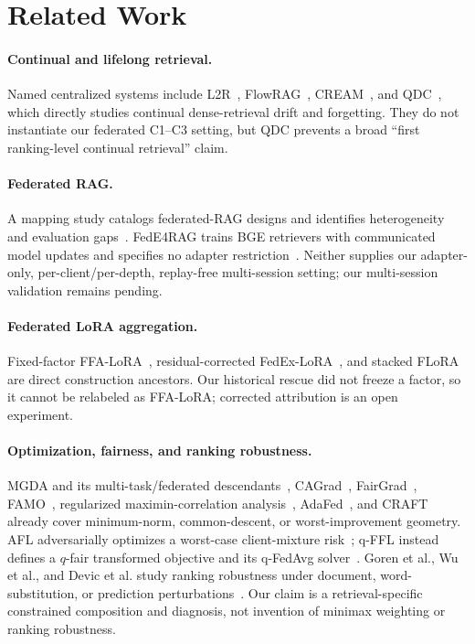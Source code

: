 \documentclass[sigconf,anonymous,review]{acmart}
\begin{document}
\section{Related Work}\label{sec:related}
\paragraph{Continual and lifelong retrieval.} Named centralized systems include L2R~\cite{cai2023l2r}, FlowRAG~\cite{zhang2026flowrag}, CREAM~\cite{cream2026}, and QDC~\cite{goswami2025qdc}, which directly studies continual dense-retrieval drift and forgetting. They do not instantiate our federated C1--C3 setting, but QDC prevents a broad ``first ranking-level continual retrieval'' claim.
\paragraph{Federated RAG.} A mapping study catalogs federated-RAG designs and identifies heterogeneity and evaluation gaps~\cite{chakraborty2025fedrag}. FedE4RAG trains BGE retrievers with communicated model updates and specifies no adapter restriction~\cite{mao2025fede4rag}. Neither supplies our adapter-only, per-client/per-depth, replay-free multi-session setting; our multi-session validation remains pending.
\paragraph{Federated LoRA aggregation.} Fixed-factor FFA-LoRA~\cite{sun2024ffalora}, residual-corrected FedEx-LoRA~\cite{singhal2025fedexlora}, and stacked FLoRA~\cite{wang2024flora} are direct construction ancestors. Our historical rescue did not freeze a factor, so it cannot be relabeled as FFA-LoRA; corrected attribution is an open experiment.
\paragraph{Optimization, fairness, and ranking robustness.} MGDA and its multi-task/federated descendants~\cite{desideri2012mgda,sener2018mtl,hu2020fedmgda}, CAGrad~\cite{liu2021cagrad}, FairGrad~\cite{ban2024fairgrad}, FAMO~\cite{liu2023famo}, regularized maximin-correlation analysis~\cite{lee2016rmca}, AdaFed~\cite{hamidi2024adafed}, and CRAFT~\cite{wang2026craft} already cover minimum-norm, common-descent, or worst-improvement geometry. AFL adversarially optimizes a worst-case client-mixture risk~\cite{mohri2019afl}; q-FFL instead defines a $q$-fair transformed objective and its q-FedAvg solver~\cite{li2020qffl}. Goren et al., Wu et al., and Devic et al. study ranking robustness under document, word-substitution, or prediction perturbations~\cite{goren2018ranking,wu2022certified,devic2024stability}. Our claim is a retrieval-specific constrained composition and diagnosis, not invention of minimax weighting or ranking robustness.
\end{document}
